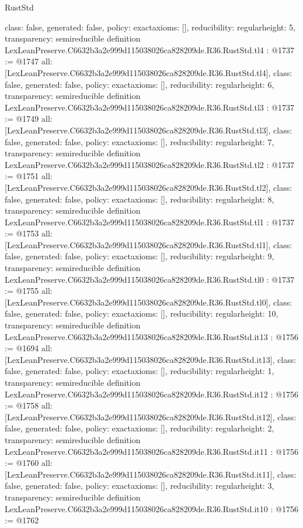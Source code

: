 \begin{lexlean}{RustStd}
\begin{coremodule}
{  class: false,
  generated: false,
  policy: exact{axioms: []},
  reducibility: regular{height: 5},
  transparency: semireducible
}
definition LexLeanPreserve.C6632b3a2e999d115038026ca828209de.R36.RustStd.tl4 : @1737 := @1747 {
  all: [LexLeanPreserve.C6632b3a2e999d115038026ca828209de.R36.RustStd.tl4],
  class: false,
  generated: false,
  policy: exact{axioms: []},
  reducibility: regular{height: 6},
  transparency: semireducible
}
definition LexLeanPreserve.C6632b3a2e999d115038026ca828209de.R36.RustStd.tl3 : @1737 := @1749 {
  all: [LexLeanPreserve.C6632b3a2e999d115038026ca828209de.R36.RustStd.tl3],
  class: false,
  generated: false,
  policy: exact{axioms: []},
  reducibility: regular{height: 7},
  transparency: semireducible
}
definition LexLeanPreserve.C6632b3a2e999d115038026ca828209de.R36.RustStd.tl2 : @1737 := @1751 {
  all: [LexLeanPreserve.C6632b3a2e999d115038026ca828209de.R36.RustStd.tl2],
  class: false,
  generated: false,
  policy: exact{axioms: []},
  reducibility: regular{height: 8},
  transparency: semireducible
}
definition LexLeanPreserve.C6632b3a2e999d115038026ca828209de.R36.RustStd.tl1 : @1737 := @1753 {
  all: [LexLeanPreserve.C6632b3a2e999d115038026ca828209de.R36.RustStd.tl1],
  class: false,
  generated: false,
  policy: exact{axioms: []},
  reducibility: regular{height: 9},
  transparency: semireducible
}
definition LexLeanPreserve.C6632b3a2e999d115038026ca828209de.R36.RustStd.tl0 : @1737 := @1755 {
  all: [LexLeanPreserve.C6632b3a2e999d115038026ca828209de.R36.RustStd.tl0],
  class: false,
  generated: false,
  policy: exact{axioms: []},
  reducibility: regular{height: 10},
  transparency: semireducible
}
definition LexLeanPreserve.C6632b3a2e999d115038026ca828209de.R36.RustStd.it13 : @1756 := @1694 {
  all: [LexLeanPreserve.C6632b3a2e999d115038026ca828209de.R36.RustStd.it13],
  class: false,
  generated: false,
  policy: exact{axioms: []},
  reducibility: regular{height: 1},
  transparency: semireducible
}
definition LexLeanPreserve.C6632b3a2e999d115038026ca828209de.R36.RustStd.it12 : @1756 := @1758 {
  all: [LexLeanPreserve.C6632b3a2e999d115038026ca828209de.R36.RustStd.it12],
  class: false,
  generated: false,
  policy: exact{axioms: []},
  reducibility: regular{height: 2},
  transparency: semireducible
}
definition LexLeanPreserve.C6632b3a2e999d115038026ca828209de.R36.RustStd.it11 : @1756 := @1760 {
  all: [LexLeanPreserve.C6632b3a2e999d115038026ca828209de.R36.RustStd.it11],
  class: false,
  generated: false,
  policy: exact{axioms: []},
  reducibility: regular{height: 3},
  transparency: semireducible
}
definition LexLeanPreserve.C6632b3a2e999d115038026ca828209de.R36.RustStd.it10 : @1756 := @1762 {
}
\end{coremodule}
\end{lexlean}
